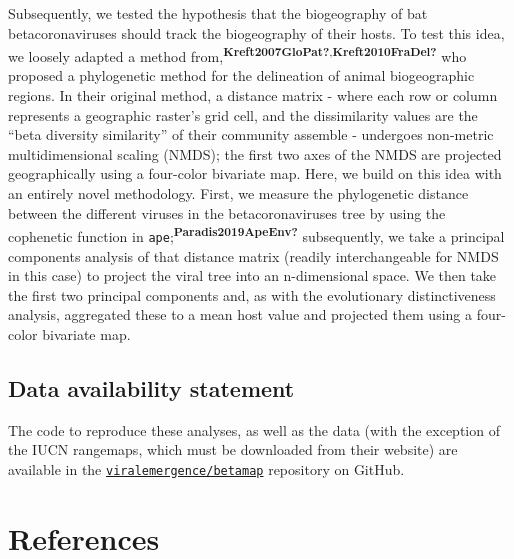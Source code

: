 \documentclass[10pt,oneside]{article}
\begin{document}
Subsequently, we tested the hypothesis that the biogeography of bat
betacoronaviruses should track the biogeography of their hosts. To test
this idea, we loosely adapted a method
from,\textsuperscript{\textbf{Kreft2007GloPat?},\textbf{Kreft2010FraDel?}}
who proposed a phylogenetic method for the delineation of animal
biogeographic regions. In their original method, a distance matrix -
where each row or column represents a geographic raster's grid cell, and
the dissimilarity values are the ``beta diversity similarity'' of their
community assemble - undergoes non-metric multidimensional scaling
(NMDS); the first two axes of the NMDS are projected geographically
using a four-color bivariate map. Here, we build on this idea with an
entirely novel methodology. First, we measure the phylogenetic distance
between the different viruses in the betacoronaviruses tree by using the
cophenetic function in
\texttt{ape};\textsuperscript{\textbf{Paradis2019ApeEnv?}} subsequently,
we take a principal components analysis of that distance matrix (readily
interchangeable for NMDS in this case) to project the viral tree into an
n-dimensional space. We then take the first two principal components
and, as with the evolutionary distinctiveness analysis, aggregated these
to a mean host value and projected them using a four-color bivariate
map.

\hypertarget{data-availability-statement}{%
\subsection{Data availability
statement}\label{data-availability-statement}}

The code to reproduce these analyses, as well as the data (with the
exception of the IUCN rangemaps, which must be downloaded from their
website) are available in the
\href{https://github.com/viralemergence/betamap}{\texttt{viralemergence/betamap}}
repository on GitHub.

\newpage

\hypertarget{references}{%
\section*{References}\label{references}}
\end{document}
